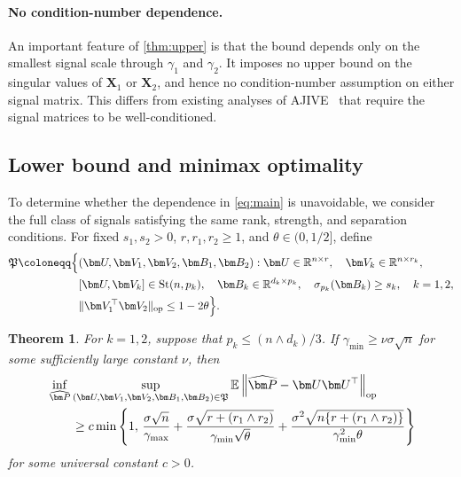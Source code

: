 \documentclass[11pt]{article}
\newtheorem{theorem}{Theorem}
\newcommand{\trans}{\top}
\newcommand{\opn}[1]{\left\lVert #1\right\rVert_{\mathrm{op}}}
\newcommand{\gmax}{\gamma_{\max}}
\begin{document}
\paragraph{No condition-number dependence.}
An important feature of \cref{thm:upper} is that the bound depends only on the
smallest signal scale through $\gamma_1$ and $\gamma_2$. It imposes no upper
bound on the singular values of $\bm X_1$ or $\bm X_2$, and hence no
condition-number assumption on either signal matrix. This differs from
existing analyses of AJIVE~\citep{yang2025estimating,li2025heterojive} that require the signal matrices to be
well-conditioned.


\subsection{Lower bound and minimax optimality}
\label{sec:lower-bound}

To determine whether the dependence in \cref{eq:main} is unavoidable, we
consider the full class of signals satisfying the same rank, strength, and
separation conditions. For fixed $s_1,s_2>0$, $r,r_1,r_2\ge1$, and
$\theta\in(0,1/2]$, define
\begin{align}
\mathfrak P
\coloneqq
\Bigl\{
  &(\bm U,\bm V_1,\bm V_2,\bm B_1,\bm B_2):
  \bm U\in\mathbb R^{n\times r},
  \quad
  \bm V_k\in\mathbb R^{n\times r_k},
  \notag\\
  &[\bm U,\bm V_k]\in\operatorname{St}(n,p_k),
  \quad
  \bm B_k\in\mathbb R^{d_k\times p_k},
  \quad
  \sigma_{p_k}(\bm B_k)\ge s_k,
  \quad k=1,2,\notag\\
  &\|\bm V_1^\trans\bm V_2\|_{\mathrm{op}}
  \le1-2\theta
\Bigr\}.
\label{eq:parameter-class}
\end{align}


\begin{theorem}
\label{thm:lower}
For $k=1,2$, suppose that $p_k\le(n\wedge d_k)/3$. If $\gamma_{\min} \ge\nu\sigma\sqrt n$ for some sufficiently large constant $\nu$, then  
\begin{align}
\label{eq:minimax-lower}
  &\inf_{\widehat{\bm P}}
  \sup_{\substack{
    (\bm U,\bm V_1,\bm V_2,\bm B_1,\bm B_2)
    \in
    \mathfrak P
  }}
  \mathbb E
  \opn{
    \widehat{\bm P}-\bm U\bm U^\trans
  } \notag\\
  &\qquad\ge
  c\min\left\{
    1,\,
    \frac{\sigma\sqrt n}{\gmax}
    +
    \frac{
      \sigma\sqrt{r+ (r_1\wedge r_2)}
    }{
      \gamma_{\min}\sqrt\theta
    }
    +
    \frac{
      \sigma^2\sqrt{n\{{r+ (r_1\wedge r_2)}\} }
    }{
      \gamma_{\min}^2\theta
    }
  \right\}
\end{align}
for some universal constant $c>0$.
\end{theorem}
\end{document}
